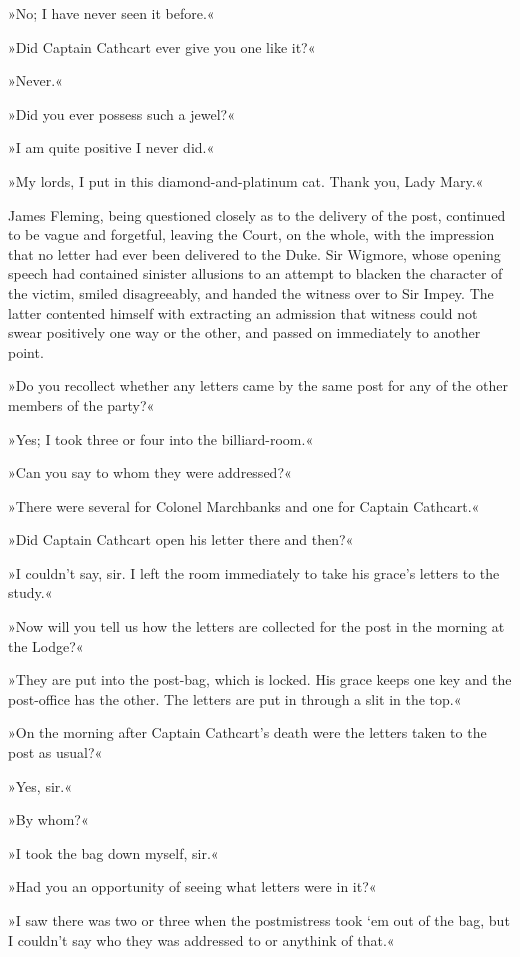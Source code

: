 »No; I have never seen it before.«

»Did Captain Cathcart ever give you one like it?«

»Never.«

»Did you ever possess such a jewel?«

»I am quite positive I never did.«

»My lords, I put in this diamond-and-platinum cat. Thank you, Lady Mary.«

James Fleming, being questioned closely as to the delivery of the post, continued to be vague and forgetful, leaving the Court, on the whole, with the impression that no letter had ever been delivered to the Duke.  Sir Wigmore, whose opening speech had contained sinister allusions to an attempt to blacken the character of the victim, smiled disagreeably, and handed the witness over to Sir Impey. The latter contented himself with extracting an admission that witness could not swear positively one way or the other, and passed on immediately to another point.

»Do you recollect whether any letters came by the same post for any of the other members of the party?«

»Yes; I took three or four into the billiard-room.«

»Can you say to whom they were addressed?«

»There were several for Colonel Marchbanks and one for Captain Cathcart.«

»Did Captain Cathcart open his letter there and then?«

»I couldn't say, sir. I left the room immediately to take his grace's letters to the study.«

»Now will you tell us how the letters are collected for the post in the morning at the Lodge?«

»They are put into the post-bag, which is locked. His grace keeps one key and the post-office has the other. The letters are put in through a slit in the top.«

»On the morning after Captain Cathcart's death were the letters taken to the post as usual?«

»Yes, sir.«

»By whom?«

»I took the bag down myself, sir.«

»Had you an opportunity of seeing what letters were in it?«

»I saw there was two or three when the postmistress took `em out of the bag, but I couldn't say who they was addressed to or anythink of that.«

